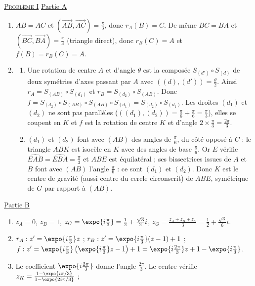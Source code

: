 \begin{corrige}
\noindent \underline{\textsc{Probl\`eme I}} \newline
\underline{Partie A}
\begin{enumerate}
\item $AB = AC$ et $(\overrightarrow{AB}, \overrightarrow{AC}) = \frac{\pi}{3}$, donc $r_A(B) = C$. De m\^eme $BC = BA$ et
      $(\overrightarrow{BC}, \overrightarrow{BA}) = \frac{\pi}{3}$ (triangle direct), donc $r_B(C) = A$ et $f(B) = r_B(C) = A$.
\item \begin{enumerate}
      \item Une rotation de centre $A$ et d'angle $\theta$ est la compos\'ee $S_{(d')} \circ S_{(d)}$ de deux sym\'etries d'axes passant par $A$
            avec $((d) , (d')) = \frac{\theta}{2}$. Ainsi $r_A = S_{(AB)} \circ S_{(d_1)}$ et $r_B = S_{(d_2)} \circ S_{(AB)}$. Donc
            $f = S_{(d_2)} \circ S_{(AB)} \circ S_{(AB)} \circ S_{(d_1)} = S_{(d_2)} \circ S_{(d_1)}$. Les droites $(d_1)$ et $(d_2)$ ne sont pas
            parall\`eles ($((d_1),(d_2)) = \frac{\pi}{6} + \frac{\pi}{6} = \frac{\pi}{3}$), elles se coupent en $K$ et $f$ est la rotation de centre
            $K$ et d'angle $2 \times \frac{\pi}{3} = \frac{2\pi}{3}$.
      \item $(d_1)$ et $(d_2)$ font avec $(AB)$ des angles de $\frac{\pi}{6}$, du c\^ot\'e oppos\'e \`a $C$ : le triangle $ABK$ est isoc\`ele
            en $K$ avec des angles de base $\frac{\pi}{6}$. Or $E$ v\'erifie $\widehat{EAB} = \widehat{EBA} = \frac{\pi}{3}$ et $ABE$ est \'equilat\'eral ;
            ses bissectrices issues de $A$ et $B$ font avec $(AB)$ l'angle $\frac{\pi}{6}$ : ce sont $(d_1)$ et $(d_2)$.
            Donc $K$ est le centre de gravit\'e (aussi centre du cercle circonscrit) de $ABE$, sym\'etrique de $G$ par rapport \`a $(AB)$.
      \end{enumerate}
\end{enumerate}
\underline{Partie B}
\begin{enumerate}
\item $z_A = 0$, $z_B = 1$, $z_C = \expo{i\frac{\pi}{3}} = \frac{1}{2} + \frac{\sqrt{3}}{2}i$,
      $z_G = \frac{z_A + z_B + z_C}{3} = \frac{1}{2} + \frac{\sqrt{3}}{6}i$.
\item $r_A : z' = \expo{i\frac{\pi}{3}} z$ ; $r_B : z' = \expo{i\frac{\pi}{3}}(z - 1) + 1$ ;
      $f : z' = \expo{i\frac{\pi}{3}}\left(\expo{i\frac{\pi}{3}} z - 1\right) + 1 = \expo{i\frac{2\pi}{3}} z + 1 - \expo{i\frac{\pi}{3}}$.
\item Le coefficient $\expo{i\frac{2\pi}{3}}$ donne l'angle $\frac{2\pi}{3}$. Le centre v\'erifie $z_K = \frac{1 - \expo{i\pi/3}}{1 - \expo{2i\pi/3}}$ ;

\end{enumerate}
\end{corrige}
